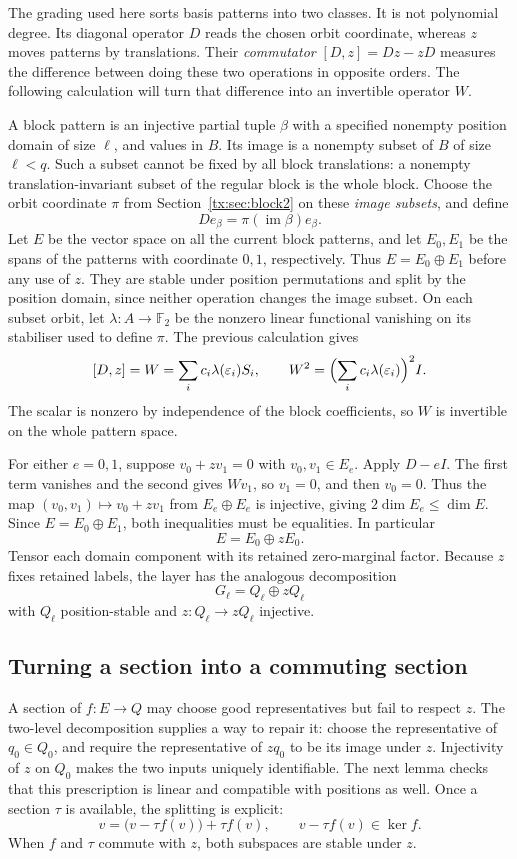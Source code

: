 \documentclass[11pt,a4paper,oneside,openany]{book}
\theoremstyle{definition}\newtheorem{definition}[theorem]{Definition}
\theoremstyle{remark}\newtheorem{remark}[theorem]{Remark}
\newcommand{\Ftwo}{\mathbb F_2}
\numberwithin{equation}{chapter}
\begin{document}
The grading used here sorts basis patterns into two classes. It is not
polynomial degree. Its diagonal operator $D$ reads the chosen orbit
coordinate, whereas $z$ moves patterns by translations. Their
\emph{commutator} $[D,z]=Dz-zD$ measures the difference between doing
these two operations in opposite orders. The following calculation
will turn that difference into an invertible operator $W$.

A block pattern is an injective partial tuple $\beta$ with a specified nonempty position domain of size $\ell$, and values in $B$. Its image is a nonempty subset of $B$ of size $\ell<q$. Such a subset cannot be fixed by all block translations: a nonempty translation-invariant subset of the regular block is the whole block. Choose the orbit coordinate $\pi$ from Section~\ref{tx:sec:block2} on these \emph{image subsets}, and define
\[
                 D e_\beta=\pi(\operatorname{im}\beta)e_\beta.
\]
Let $E$ be the vector space on all the current block patterns, and let $E_0,E_1$ be the spans of the patterns with coordinate $0,1$, respectively. Thus $E=E_0\oplus E_1$ before any use of $z$. They are stable under position permutations and split by the position domain, since neither operation changes the image subset. On each subset orbit, let $\lambda:A\to\Ftwo$ be the nonzero linear functional vanishing on its stabiliser used to define $\pi$. The previous calculation gives
\[
 [D,z]=W=\sum_i c_i\lambda(\varepsilon_i)S_i,
 \qquad W^2=\Bigl(\sum_i c_i\lambda(\varepsilon_i)\Bigr)^2I.
\]
The scalar is nonzero by independence of the block coefficients, so $W$ is invertible on the whole pattern space.

For either $e=0,1$, suppose $v_0+zv_1=0$ with $v_0,v_1\in E_e$. Apply $D-eI$. The first term vanishes and the second gives $Wv_1$, so $v_1=0$, and then $v_0=0$. Thus the map $(v_0,v_1)\mapsto v_0+zv_1$ from $E_e\oplus E_e$ is injective, giving $2\dim E_e\le\dim E$. Since $E=E_0\oplus E_1$, both inequalities must be equalities. In particular
\[E=E_0\oplus zE_0.
\]
Tensor each domain component with its retained zero-marginal factor. Because $z$ fixes retained labels, the layer has the analogous decomposition
\[G_\ell=Q_\ell\oplus zQ_\ell
\]
with $Q_\ell$ position-stable and $z:Q_\ell\to zQ_\ell$ injective.

\subsection{Turning a section into a commuting section}
A section of $f:E\to Q$ may choose good representatives but fail to
respect $z$. The two-level decomposition supplies a way to repair it:
choose the representative of $q_0\in Q_0$, and require the
representative of $zq_0$ to be its image under $z$. Injectivity of
$z$ on $Q_0$ makes the two inputs uniquely identifiable. The next
lemma checks that this prescription is linear and compatible with
positions as well. Once a section $\tau$ is available, the splitting
is explicit:
\[
             v=\bigl(v-\tau f(v)\bigr)+\tau f(v),
       \qquad v-\tau f(v)\in\ker f.
\]
When $f$ and $\tau$ commute with $z$, both subspaces are stable under $z$.
\end{document}
